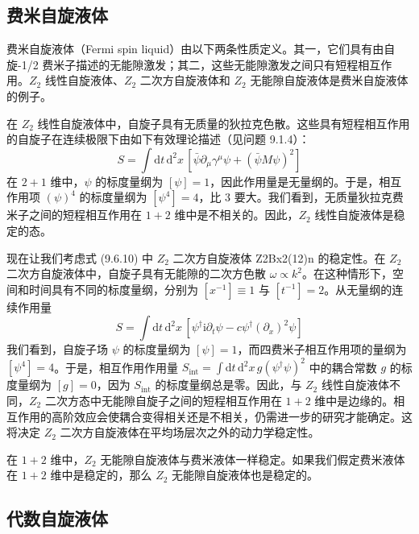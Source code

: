 \subsection{费米自旋液体}

费米自旋液体（Fermi spin liquid）由以下两条性质定义。其一，它们具有由自旋-1/2 费米子描述的无能隙激发；其二，这些无能隙激发之间只有短程相互作用。$Z_2$ 线性自旋液体、$Z_2$ 二次方自旋液体和 $Z_2$ 无能隙自旋液体是费米自旋液体的例子。

在 $Z_2$ 线性自旋液体中，自旋子具有无质量的狄拉克色散。这些具有短程相互作用的自旋子在连续极限下由如下有效理论描述（见问题 9.1.4）：
\begin{equation*}
S=\int\mathrm{d}t\,\mathrm{d}^{2}x\,\left[\bar{\psi}\partial_{\mu}\gamma^{\mu}\psi+\left(\bar{\psi}M\psi\right)^{2}\right]
\end{equation*}
在 $2+1$ 维中，$\psi$ 的标度量纲为 $[\psi]=1$，因此作用量是无量纲的。于是，相互作用项 $(\psi)^{4}$ 的标度量纲为 $[\psi^{4}]=4$，比 3 要大。我们看到，无质量狄拉克费米子之间的短程相互作用在 $1+2$ 维中是不相关的。因此，$Z_2$ 线性自旋液体是稳定的态。

现在让我们考虑式 (9.6.10) 中 $Z_2$ 二次方自旋液体 Z2Bx2(12)n 的稳定性。在 $Z_2$ 二次方自旋液体中，自旋子具有无能隙的二次方色散 $\omega\propto k^{2}$。在这种情形下，空间和时间具有不同的标度量纲，分别为 $[x^{-1}]\equiv1$ 与 $[t^{-1}]=2$。从无量纲的连续作用量
\begin{equation*}
S=\int\mathrm{d}t\,\mathrm{d}^{2}x\,\left[\psi^{\dagger}\mathrm{i}\partial_{t}\psi-c\psi^{\dagger}(\partial_{x})^{2}\psi\right]
\end{equation*}
我们看到，自旋子场 $\psi$ 的标度量纲为 $[\psi]=1$，而四费米子相互作用项的量纲为 $[\psi^{4}]=4$。于是，相互作用作用量 $S_{\mathrm{int}}=\int\mathrm{d}t\,\mathrm{d}^{2}x\,g(\psi^{\dagger}\psi)^{2}$ 中的耦合常数 $g$ 的标度量纲为 $[g]=0$，因为 $S_{\mathrm{int}}$ 的标度量纲总是零。因此，与 $Z_2$ 线性自旋液体不同，$Z_2$ 二次方态中无能隙自旋子之间的短程相互作用在 $1+2$ 维中是边缘的。相互作用的高阶效应会使耦合变得相关还是不相关，仍需进一步的研究才能确定。这将决定 $Z_2$ 二次方自旋液体在平均场层次之外的动力学稳定性。

在 $1+2$ 维中，$Z_2$ 无能隙自旋液体与费米液体一样稳定。如果我们假定费米液体在 $1+2$ 维中是稳定的，那么 $Z_2$ 无能隙自旋液体也是稳定的。

\subsection{代数自旋液体}

